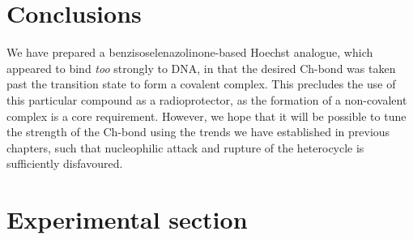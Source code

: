 \begin{refsection}
\section{Conclusions}
We have prepared a benzisoselenazolinone-based Hoechst analogue, which appeared to bind \emph{too} strongly to DNA, in that the desired Ch-bond was taken past the transition state to form a covalent complex.
This precludes the use of this particular compound as a radioprotector, as the formation of a non-covalent complex is a core requirement.
However, we hope that it will be possible to tune the strength of the Ch-bond using the trends we have established in previous chapters, such that nucleophilic attack and rupture of the heterocycle is sufficiently disfavoured.

\section{Experimental section}

\end{refsection}
